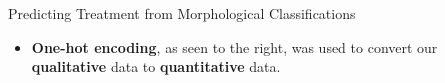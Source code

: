 \documentclass[final]{beamer}
\newlength{\colwidth}
\begin{document}
\begin{frame}[t]
\begin{columns}[t]
\begin{column}{\colwidth}
\begin{block}{Predicting Treatment from Morphological Classifications}
\vspace{-1em}


\begin{itemize}
    \parpic(0px, 0px)(0px, 1.3cm)[r]{
    }
    \item \textbf{One-hot encoding}, as seen to the right, was used to convert our \textbf{qualitative} data to \textbf{quantitative} data.
\end{itemize}



\end{block}
\end{column}
\end{columns}
\end{frame}
\end{document}
